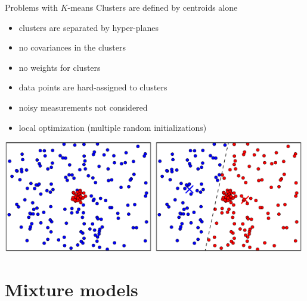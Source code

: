 \documentclass[compress,t]{beamer}
\begin{document}
\begin{frame}{Problems with $K$-means}
  Clusters are defined by \alert{centroids alone}
  \begin{itemize}
    \item clusters are separated by hyper-planes
    \item no covariances in the clusters
    \item no weights for clusters
    \item data points are hard-assigned to clusters
    \item noisy measurements not considered
    \item local optimization (multiple random initializations)
  \end{itemize}
  \begin{center}
    \includegraphics[width=0.49\textwidth]{break1-12}
    \includegraphics[width=0.49\textwidth]{break1-11}
  \end{center}
\end{frame}

\section{Mixture models}
\end{document}
